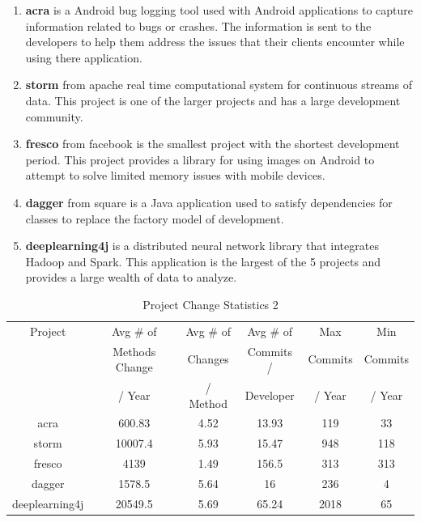\begin{enumerate}
\item \textbf{acra} is a Android bug logging tool used with Android applications to capture information related to bugs or crashes. The information is sent to the developers to help them address the issues that their clients encounter while using there application.
\item \textbf{storm} from apache real time computational system for continuous streams of data. This project is one of the larger projects and has a large development community.
\item \textbf{fresco} from facebook is the smallest project with the shortest development period. This project provides a library for using images on Android to attempt to solve limited memory issues with mobile devices.
\item \textbf{dagger} from square is a Java application used to satisfy dependencies for classes to replace the factory model of development.
\item \textbf{deeplearning4j} is a distributed neural network library that integrates Hadoop and Spark. This application is the largest of the 5 projects and provides a large wealth of data to analyze.
\end{enumerate}

\begin{table}
\begin{center}
    \begin{tabular}{|c|c|c|c|c|c|}
        \hline
        Project & Avg \# of & Avg \# of & Avg \# of & Max & Min \\
         & Methods Change & Changes & Commits / & Commits & Commits \\
         & / Year & / Method & Developer & / Year & / Year \\
        \hline
        acra & 600.83 & 4.52 & 13.93 & 119 & 33 \\
        storm & 10007.4 & 5.93 & 15.47 & 948 & 118 \\
        fresco & 4139 & 1.49 & 156.5 & 313 & 313 \\
        dagger & 1578.5 & 5.64 & 16 & 236 & 4 \\
        deeplearning4j & 20549.5 & 5.69 & 65.24 & 2018 & 65 \\
        \hline
    \end{tabular}
\end{center}
\caption{Project Change Statistics 2}
\label{tab:project_stats_2}
\end{table}

